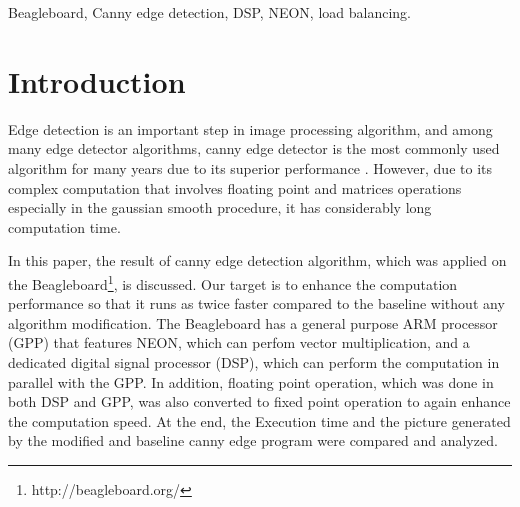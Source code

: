 \documentclass[conference]{IEEEtran}
\begin{document}




\maketitle

\begin{abstract}
Canny Edge Detection is a well-known edge detection algorithm, which has been proven to provide superior result compared to other methods. However, it also has slower execution time due to its heavy computation on floating point and intense matrix operation. Profiling the baseline program shows that around 78\% of the processing time is spent in the gaussian-smooth function. In this paper, implementation of canny edge detection algorithm on Beagleboard platform which has NEON feature in its General Purposed Processing unit (GPP) and a dedicated Digital Signal Processor (DSP) is discussed. The result shows that by converting floating point operation into fixed point operation, and load balancing gaussian-smooth function, i.e., performing the computation parallely 38\% in GPP using NEON with and 62 \%in DSP, a speed up factor of 2.1 compared to the baseline program was achieved.

\end{abstract}

\begin{IEEEkeywords}
Beagleboard, Canny edge detection, DSP, NEON, load balancing.
\end{IEEEkeywords}

\IEEEpeerreviewmaketitle


\section{Introduction}
Edge detection is an important step in image processing algorithm, and among many edge detector algorithms, canny edge detector is the most commonly used algorithm for many years due to its superior performance \cite{paper1}. However, due to its complex computation that involves floating point and matrices operations especially in the gaussian smooth procedure, it has considerably long computation time.

In this paper, the result of canny edge detection algorithm, which was applied on the Beagleboard\footnote{http://beagleboard.org/}, is discussed. Our target is to enhance the computation performance so that it runs as twice faster compared to the baseline without any algorithm modification. The Beagleboard has a general purpose ARM processor (GPP) that features NEON, which can perfom vector multiplication, and a dedicated digital signal processor (DSP), which can perform the computation in parallel with the GPP. In addition, floating point operation, which was done in both DSP and GPP, was also converted to fixed point operation to again enhance the computation speed. At the end, the Execution time and the picture generated by the modified and baseline canny edge program were compared and analyzed.
\end{document}
